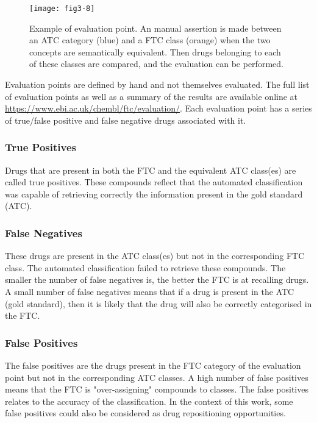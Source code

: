\begin{figure}[ht]
    \centering
    \texttt{[image: fig3-8]}
    \caption{Example of evaluation point. An manual assertion is made between an ATC category (blue) and a FTC class (orange) when the two concepts are semantically equivalent. Then drugs belonging to each of these classes are compared, and the evaluation can be performed.}
    \label{fig3-8}
\end{figure}

Evaluation points are defined by hand and not themselves evaluated. The full list of evaluation points as well as a summary of the results are available online at \url{https://www.ebi.ac.uk/chembl/ftc/evaluation/}. Each evaluation point has a series of true/false positive and false negative drugs associated with it.

\subsubsection{True Positives}
Drugs that are present in both the FTC and the equivalent ATC class(es) are called true positives. These compounds reflect that the automated classification was capable of retrieving correctly the information present in the gold standard (ATC).

\subsubsection{False Negatives}
These drugs are present in the ATC class(es) but not in the corresponding FTC class. The automated classification failed to retrieve these compounds. The smaller the number of false negatives is, the better the FTC is at recalling drugs. A small number of false negatives means that if a drug is present in the ATC (gold standard), then it is likely that the drug will also be correctly categorised in the FTC.

\subsubsection{False Positives}
The false positives are the drugs present in the FTC category of the evaluation point but not in the corresponding ATC classes. A high number of false positives means that the FTC is "over-assigning" compounds to classes. The false positives relates to the accuracy of the classification. In the context of this work, some false positives could also be considered as drug repositioning opportunities.

